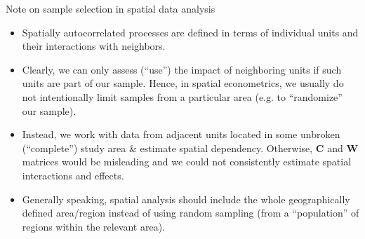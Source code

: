 \documentclass{beamer}
\begin{document}
\begin{frame}{Note on sample selection in spatial data analysis}
\begin{itemize}
    \item Spatially autocorrelated processes are defined in terms of individual units and their interactions with neighbors. 
    \smallskip
    \item Clearly, we can only assess (``use'') the impact of neighboring units if such units are part of our sample. Hence, in spatial econometrics, we usually do not intentionally limit samples from a particular area (e.g. to ``randomize'' our sample).
    \smallskip
    \item Instead, we work with data from adjacent units located in some unbroken (``complete'') study area \& estimate spatial dependency. Otherwise, $\bm{C}$ and $\bm{W}$ matrices would be misleading and we could not consistently estimate spatial interactions and effects.
    \smallskip    
    \item Generally speaking, spatial analysis should include the whole geographically defined area/region instead of using random sampling (from a ``population'' of regions within the relevant area). 
\end{itemize}
\end{frame}
\end{document}
